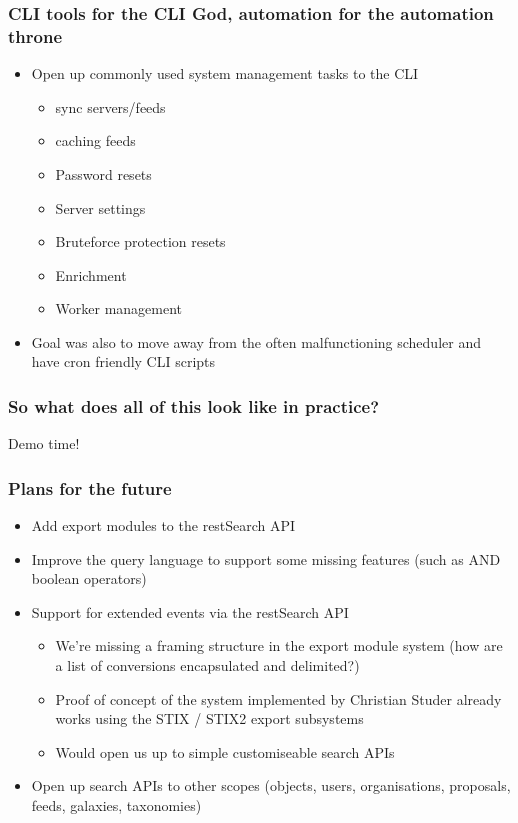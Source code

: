 \begin{frame}
\frametitle{CLI tools for the CLI God, automation for the automation throne}
    \begin{itemize}
	\item Open up commonly used system management tasks to the CLI
        \begin{itemize}
            \item sync servers/feeds
            \item caching feeds
            \item Password resets
            \item Server settings
            \item Bruteforce protection resets
            \item Enrichment
            \item Worker management
        \end{itemize}
        \item Goal was also to move away from the often malfunctioning scheduler and have cron friendly CLI scripts
    \end{itemize}
\end{frame}

\begin{frame}
\frametitle{So what does all of this look like in practice?}
        \begin{center}
        	\item Demo time!
        \end{center}
\end{frame}

\begin{frame}
\frametitle{Plans for the future}
    \begin{itemize}
	\item Add export modules to the restSearch API
        \item Improve the query language to support some missing features (such as AND boolean operators)
        \item Support for extended events via the restSearch API
	\begin{itemize}
	    \item We're missing a framing structure in the export module system (how are a list of conversions encapsulated and delimited?)
            \item Proof of concept of the system implemented by Christian Studer already works using the STIX / STIX2 export subsystems
	    \item Would open us up to simple customiseable search APIs
	\end{itemize}
	\item Open up search APIs to other scopes (objects, users, organisations, proposals, feeds, galaxies, taxonomies)
    \end{itemize}
\end{frame}

